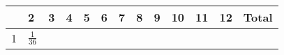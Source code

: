\documentclass[]{book}
\numberwithin{equation}{chapter}
\numberwithin{figure}{chapter}
\theoremstyle{plain}
\theoremstyle{definition}
\theoremstyle{remark}
\theoremstyle{definition}
\theoremstyle{definition}
\theoremstyle{remark}
\begin{document}
\begin{longtable}[]{@{}lllllllllllll@{}}
\begin{minipage}[b]{0.02\columnwidth}
\strut
\end{minipage} & \begin{minipage}[b]{0.05\columnwidth}\raggedright\strut
2\strut
\end{minipage} & \begin{minipage}[b]{0.05\columnwidth}\raggedright\strut
3\strut
\end{minipage} & \begin{minipage}[b]{0.05\columnwidth}\raggedright\strut
4\strut
\end{minipage} & \begin{minipage}[b]{0.05\columnwidth}\raggedright\strut
5\strut
\end{minipage} & \begin{minipage}[b]{0.05\columnwidth}\raggedright\strut
6\strut
\end{minipage} & \begin{minipage}[b]{0.05\columnwidth}\raggedright\strut
7\strut
\end{minipage} & \begin{minipage}[b]{0.05\columnwidth}\raggedright\strut
8\strut
\end{minipage} & \begin{minipage}[b]{0.05\columnwidth}\raggedright\strut
9\strut
\end{minipage} & \begin{minipage}[b]{0.05\columnwidth}\raggedright\strut
10\strut
\end{minipage} & \begin{minipage}[b]{0.05\columnwidth}\raggedright\strut
11\strut
\end{minipage} & \begin{minipage}[b]{0.05\columnwidth}\raggedright\strut
12\strut
\end{minipage} & \begin{minipage}[b]{0.06\columnwidth}\raggedright\strut
Total\strut
\end{minipage}\tabularnewline
\midrule
\endhead
\begin{minipage}[t]{0.02\columnwidth}\raggedright\strut
1\strut
\end{minipage} & \begin{minipage}[t]{0.05\columnwidth}\raggedright\strut
\(\frac{1}{36}\)\strut
\end{minipage} & \begin{minipage}[t]{0.05\columnwidth}\raggedright\strut
\strut
\end{minipage} & \begin{minipage}[t]{0.05\columnwidth}\raggedright\strut

\end{minipage}
\end{longtable}
\end{document}
